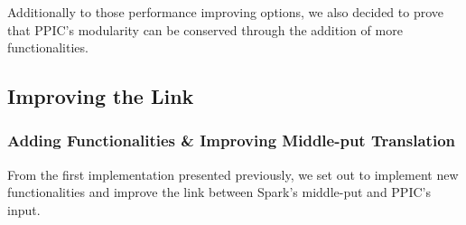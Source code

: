 \documentclass{eplmastersthesis}
\begin{document}
Additionally to those performance improving options, we also decided to prove that PPIC's modularity can be conserved through the addition of more functionalities.

\subsection{Improving the Link}

\subsubsection{Adding Functionalities \& Improving Middle-put Translation}

From the first implementation presented previously, we set out to implement new functionalities and improve the link between Spark's middle-put and PPIC's input. \newline
\end{document}
